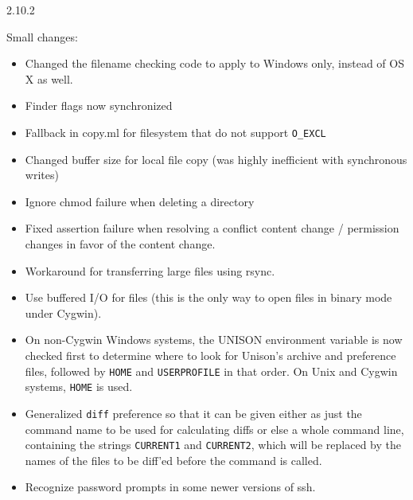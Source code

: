 \begin{changesfromversion}{2.10.2}
\begin{itemize}
\end{itemize}
\item Small changes:
\begin{itemize}
\item Changed the filename checking code to apply to Windows only, instead
  of OS X as well.
\item Finder flags now synchronized
\item Fallback in copy.ml for filesystem that do not support \verb|O_EXCL|
\item  Changed buffer size for local file copy (was highly inefficient with
  synchronous writes)
\item Ignore chmod failure when deleting a directory
\item  Fixed assertion failure when resolving a conflict content change /
  permission changes in favor of the content change.
\item Workaround for transferring large files using rsync.
\item Use buffered I/O for files (this is the only way to open files in binary
  mode under Cygwin).
\item On non-Cygwin Windows systems, the UNISON environment variable is now checked first to determine
  where to look for Unison's archive and preference files, followed by \verb|HOME| and
  \verb|USERPROFILE| in that order.  On Unix and Cygwin systems, \verb|HOME| is used.
\item Generalized \verb|diff| preference so that it can be given either as just
  the command name to be used for calculating diffs or else a whole command
  line, containing the strings \verb|CURRENT1| and \verb|CURRENT2|, which will be replaced
  by the names of the files to be diff'ed before the command is called.
\item Recognize password prompts in some newer versions of ssh.
\end{itemize}
\end{changesfromversion}

